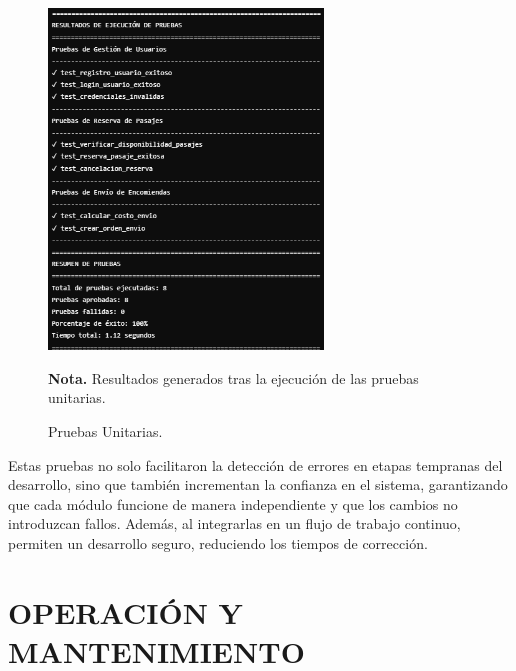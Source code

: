 	\begin{figure}[!h] %
		\caption[Pruebas Unitarias]
		{\newline Pruebas Unitarias.} %
		\centering
		\includegraphics[width=0.65\textwidth]{imagenes/cap_3/pruebas_unitarias.png} %
		\begin{flushleft}
			\hspace{1.20cm} \textbf{Nota.} Resultados generados tras la ejecución de las pruebas unitarias. %
		\end{flushleft}
		\label{fig:prue_uni} %
	\end{figure}
	\vspace{-20pt} %
	
	Estas pruebas no solo facilitaron la detección de errores en etapas tempranas del desarrollo, sino que también incrementan la confianza en el sistema, garantizando que cada módulo funcione de manera independiente y que los cambios no introduzcan fallos. Además, al integrarlas en un flujo de trabajo continuo, permiten un desarrollo seguro, reduciendo los tiempos de corrección.
	
 \section{OPERACIÓN Y MANTENIMIENTO}
 
